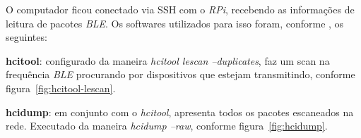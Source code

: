 \documentclass[
	12pt,				%
	openright,			%
	oneside,			%
	a4paper,			%
	chapter=TITLE,		%
	english,			%
	brazil				%
	]{abntex2}
\begin{document}
{\begin{figure}[htb]
\end{figure}

O computador ficou conectado via SSH com o \textit{RPi}, recebendo as informações de leitura de pacotes \textit{BLE}. Os softwares utilizados para isso foram, conforme , os seguintes:

\begin{alineas}
	\item \textbf{hcitool}: configurado da maneira \textit{hcitool lescan --duplicates}, faz um scan na frequência \textit{BLE} procurando por dispositivos que estejam transmitindo, conforme figura~\ref{fig:hcitool-lescan}.
	\item \textbf{hcidump}: em conjunto com o \textit{hcitool}, apresenta todos os pacotes escaneados na rede. Executado da maneira \textit{hcidump --raw}, conforme figura~\ref{fig:hcidump}.
\end{alineas}

\begin{figure}[htb]
\end{figure}

}
\end{document}
